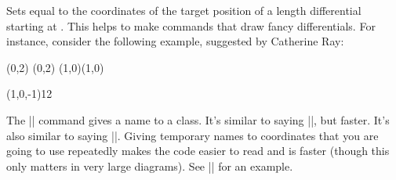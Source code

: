 \begin{sseqdata}[|| name = ex1, cohomological Serre grading]
\begin{command}{\getdtarget{}\pars{\sourcecoord}}
Sets  equal to the coordinates of the target position of a length  differential starting at \sourcecoord. This helps to make commands that draw fancy differentials. For instance, consider the following example, suggested by Catherine Ray:
\begin{codeexample}[]
\begin{sseqdata}[ name = cathex, Adams grading, differentials = { blue } ]
\class(0,2)
\class(0,2)
\class(1,0)\class(1,0)

(1,0,-1){1}{2}
\end{sseqdata}
\printpage[ name = cathex, page = 1 ]
\qquad
\printpage[ name = cathex, page = 2 ]
\qquad
\printpage[ name = cathex, page = 3 ]
\end{codeexample}
\end{command}

\begin{command}{\nameclass{}}
The |\nameclass| command gives a name to a class. It's similar to saying |\doptions[name = |\meta{name}|]|, but faster. It's also similar to saying |\pushstack|. Giving temporary names to coordinates that you are going to use repeatedly makes the code easier to read and is faster (though this only matters in very large diagrams). See |\getdtarget| for an example.
\end{command}


\end{sseqdata}
